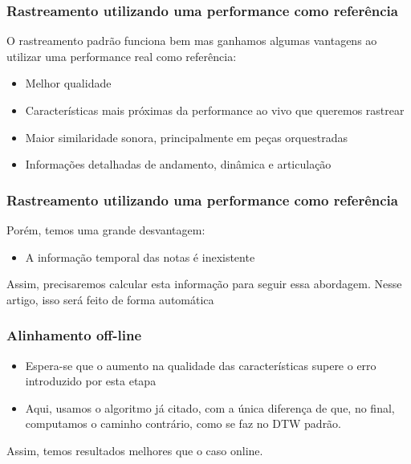 \documentclass[serif,mathserif]{beamer}
\begin{document}
\begin{frame}
  \frametitle{Rastreamento utilizando uma performance como referência}
  O rastreamento padrão funciona bem mas ganhamos algumas vantagens ao utilizar uma performance real como referência:\pause
  \begin{itemize}
    \item Melhor qualidade\pause
    \item Características mais próximas da performance ao vivo que queremos rastrear\pause
    \item Maior similaridade sonora, principalmente em peças orquestradas\pause
    \item Informações detalhadas de andamento, dinâmica e articulação
  \end{itemize}
\end{frame}

\begin{frame}
  \frametitle{Rastreamento utilizando uma performance como referência}
  Porém, temos uma grande desvantagem:\pause
  \begin{itemize}
    \item A informação temporal das notas é inexistente\pause
  \end{itemize}
  Assim, precisaremos calcular esta informação para seguir essa abordagem. \pause Nesse artigo, isso será feito de forma automática
\end{frame}


\begin{frame}
  \frametitle{Alinhamento off-line}
  \begin{itemize}
    \item Espera-se que o aumento na qualidade das características supere o erro introduzido por esta etapa\pause
    \item Aqui, usamos o algoritmo já citado, com a única diferença de que, no final, computamos o caminho contrário, como se faz no DTW padrão.
  \end{itemize}
  Assim, temos resultados melhores que o caso online.
\end{frame}
\end{document}
